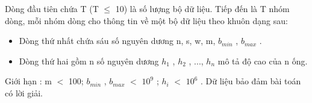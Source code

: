 Dòng đầu tiên chứa T (T $\le$ 10) là số lượng bộ dữ liệu. Tiếp đến là T nhóm dòng, mỗi nhóm dòng cho thông tin về một bộ dữ liệu theo khuôn dạng sau:
\begin{itemize}
	\item Dòng thứ nhất chứa sáu số nguyên dương n, s, w, m, $b_{min}$ , $b_{max}$ .
	\item Dòng thứ hai gồm n số nguyên dương $h_{1}$ , $h_{2}$ , ..., $h_{n}$ mô tả độ cao của n ống.
\end{itemize}

Giới hạn : m $<$ 100; $b_{min}$ , $b_{max}$ $<$ $10^{9}$ ; $h_{i}$ $<$ $10^{6}$ . Dữ liệu bảo đảm bài toán có lời giải.
\begin{itemize}
\end{itemize}